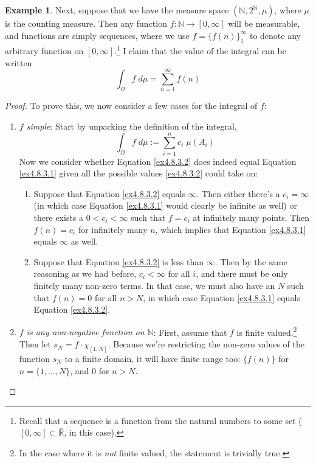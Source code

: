 \documentclass[12pt]{article}
\theoremstyle{plain}
\theoremstyle{definition}
\newtheorem{ex}[thm]{Example}
\theoremstyle{remark}
\begin{document}
\clearpage
\begin{ex}
Next, suppose that we have the measure space
$(\mathbb{N},2^\mathbb{N}, \mu)$, where $\mu$ is the counting
measure. Then any function $f: \mathbb{N}\rightarrow[0,\infty]$  will be
measurable, and functions are simply sequences, where we use
$f=\{f(n)\}_1^\infty$ to denote any arbitrary function on
$[0,\infty]$.\footnote{Recall that a sequence is a function from the
natural numbers to some set ($[0,\infty]\subset\bar{\mathbb{R}}$, in
this case).} I claim that the value of the integral can be written
\begin{equation}
  \int_\Omega f \; d\mu = \sum^\infty_{n=1}f(n)
  \label{ex4.8.3.1}
\end{equation}
\begin{proof}
To prove this, we now consider a few cases for the integral of $f$:
\begin{enumerate}
  \item {\sl $f$ simple}: Start by unpacking the definition of the
    integral,
    \begin{equation}
      \label{ex4.8.3.2}
      \int_\Omega f \; d\mu := \sum^n_{i=1} c_i \; \mu(A_i)
    \end{equation}
    Now we consider whether Equation \ref{ex4.8.3.2} does indeed equal
    Equation \ref{ex4.8.3.1} given all the possible values
    \ref{ex4.8.3.2} could take on:
    \begin{enumerate}
      \item Suppose that Equation \ref{ex4.8.3.2} equals $\infty$. Then
        either there's a $c_i=\infty$ (in which case Equation
        \ref{ex4.8.3.1} would clearly be infinite as well) or there
        exists a $0< c_i<\infty$ such that $f = c_i$ at infinitely many
        points. Then $f(n)=c_i$ for infinitely many $n$, which implies
        that Equation \ref{ex4.8.3.1} equals $\infty$ as well.

      \item Suppose that Equation \ref{ex4.8.3.2} is less than $\infty$.
        Then by the same reasoning as we had before, $c_i<\infty$ for
        all $i$, and there must be only finitely many non-zero terms. In
        that case, we must also have an $N$ such that $f(n)=0$ for all
        $n>N$, in which case Equation \ref{ex4.8.3.1} equals Equation
        \ref{ex4.8.3.2}.
    \end{enumerate}

  \item {\sl $f$ is any non-negative function on $\mathbb{N}$}: First,
    assume that $f$ is finite valued.\footnote{In the case where it is
      \emph{not} finite valued, the statement is trivially true.}  Then
      let $s_N = f\cdot\chi_{[1,N]}$. Because we're restricting the
      non-zero values of the function $s_N$ to a finite domain, it will
      have finite range too: $\{f(n)\}$ for $n=\{1,\ldots,N\}$, and 0
      for $n>N$.


\end{enumerate}
\end{proof}
\end{ex}
\end{document}
